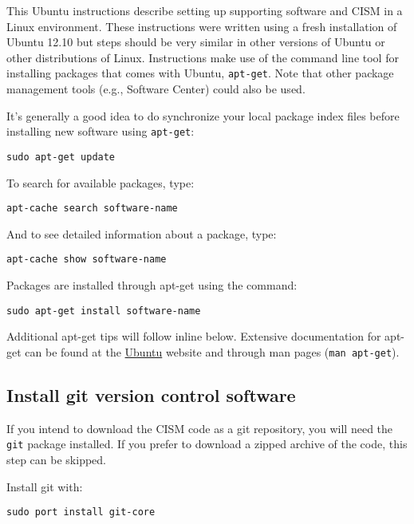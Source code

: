 \begin{mdframed}[style=ubuntu] %
This Ubuntu instructions describe setting up supporting software and CISM in a Linux environment.
These instructions were written using a fresh installation of Ubuntu 12.10 but 
steps should be very similar in other versions of Ubuntu or other distributions of Linux.
Instructions make use of the command line tool for installing packages that comes with Ubuntu, 
\texttt{apt-get}.  Note that other package management tools (e.g., Software Center)
could also be used.

It's generally a good idea to do synchronize your local package index files before
installing new software using \texttt{apt-get}:

\texttt{sudo apt-get update}

To search for available packages, type:

\texttt{apt-cache search software-name}

And to see detailed information about a package, type:

\texttt{apt-cache show software-name}

Packages are installed through apt-get using the command:

\texttt{sudo apt-get install software-name}

Additional apt-get tips will follow inline below. Extensive documentation for apt-get 
can be found at the \href{https://help.ubuntu.com/community/AptGet/Howto}{Ubuntu} website
and through man pages (\texttt{man apt-get}).
\end{mdframed}                 %



\subsection{Install git version control software}
If you intend to download the CISM code as a git repository, you will need the \texttt{git} package installed.
If you prefer to download a zipped archive of the code, this step can be skipped.


\begin{mdframed}[style=mac] %
Install git with:

\texttt{sudo port install git-core}
\end{mdframed}              %


